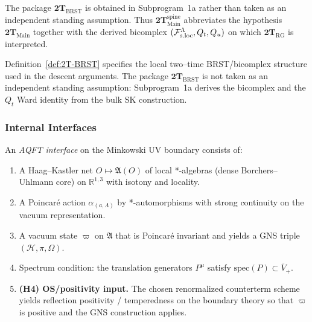 \begin{remark}
The package $\mathbf{2T}_{\mathrm{BRST}}$ is obtained in Subprogram~1a rather
than taken as an independent standing assumption. Thus
$\mathbf{2T}_{\mathrm{Main}}^{\mathrm{spine}}$ abbreviates the hypothesis
$\mathbf{2T}_{\mathrm{Main}}$ together with the derived bicomplex
$(\mathcal F_{\mathrm{s.loc}}^\Lambda,Q_t,Q_u)$ on which $\mathbf{2T}_{\mathrm{RG}}$ is interpreted.
\end{remark}

\begin{remark}
Definition~\ref{def:2T-BRST} specifies the local two--time BRST/bicomplex
structure used in the descent arguments. The package
\(\mathbf{2T}_{\mathrm{BRST}}\) is not taken as an independent standing
assumption: Subprogram~1a derives the bicomplex and the \(Q_t\) Ward identity
from the bulk SK construction.
\end{remark}

\subsubsection{Internal Interfaces}

\begin{definition}
\label{def:2T-AQFT}
An \emph{AQFT interface} on the Minkowski UV boundary consists of:
\begin{enumerate}[label=\textbf{(Q\arabic*)},leftmargin=*,itemsep=0.5em]
\item A Haag--Kastler net $O\mapsto\mathfrak A(O)$ of local *-algebras
  (dense Borchers--Uhlmann core) on $\mathbb R^{1,3}$ with isotony and locality.
\item A Poincar\'e action $\alpha_{(a,\Lambda)}$ by *-automorphisms with strong
  continuity on the vacuum representation.
\item A vacuum state $\varpi$ on $\mathfrak A$ that is Poincar\'e invariant and
  yields a GNS triple $(\mathcal H,\pi,\Omega)$.
\item Spectrum condition: the translation generators $P^\mu$ satisfy
  $\mathrm{spec}(P)\subset\overline V_+$.
\item \textbf{(H4) OS/positivity input.} The chosen renormalized counterterm scheme yields
  reflection positivity / temperedness on the boundary theory so that $\varpi$ is
  positive and the GNS construction applies.
\end{enumerate}
\end{definition}

